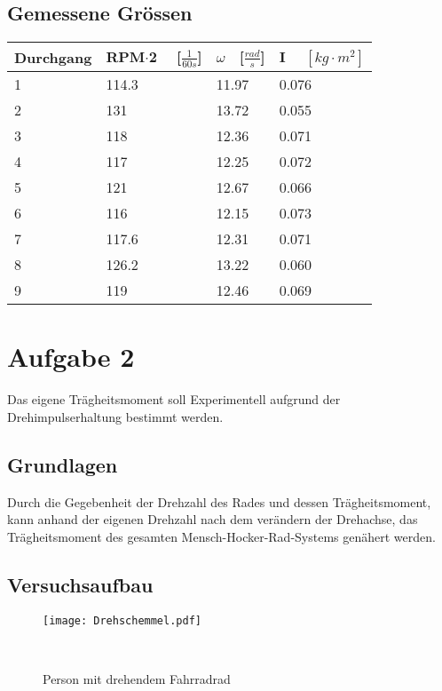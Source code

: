 \documentclass{article}
\begin{document}
\subsection{Gemessene Grössen}
\begin{table}[h]
    \begin{tabular}{|l|l|l|l|}
        \hline
  
        Durchgang & RPM$\cdot$2 $ \quad $[$\frac{1}{60s}$]   & $\omega \quad $[$\frac{rad}{s}$] & I $\quad [kg\cdot m^2]$ \\ \hline
        1         & 114.3 & 11.97 & 0.076 \\ 
        2         & 131   & 13.72 & 0.055 \\ 
        3         & 118   & 12.36 & 0.071 \\ 
        4         & 117   & 12.25 & 0.072 \\ 
        5         & 121   & 12.67 & 0.066 \\ 
        6         & 116   & 12.15 & 0.073 \\ 
        7         & 117.6 & 12.31 & 0.071 \\ 
        8         & 126.2 & 13.22 & 0.060 \\ 
        9         & 119   & 12.46 & 0.069 \\
        \hline
    \end{tabular}
\end{table}
\section{Aufgabe 2}
Das eigene Trägheitsmoment soll Experimentell aufgrund der Drehimpulserhaltung bestimmt werden.     
\subsection{Grundlagen}
Durch die Gegebenheit der Drehzahl des Rades und dessen Trägheitsmoment, kann anhand der eigenen
Drehzahl nach dem verändern der Drehachse, das Trägheitsmoment des gesamten 
 Mensch-Hocker-Rad-Systems genähert werden.

\subsection{Versuchsaufbau}
\begin{figure}[h]
\center

\texttt{[image: Drehschemmel.pdf]} 
\caption{Person mit drehendem Fahrradrad}
\
\end{figure}
\end{document}
